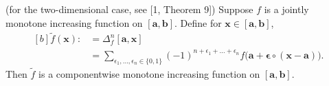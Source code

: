\documentclass{ijclclp}
\begin{document}
\begin{lemma}{(for the two-dimensional case, see [1, Theorem 9])}
    Suppose \(f\) is a jointly monotone increasing function on \([\boldsymbol{a},\boldsymbol{b}]\). Define for \(\boldsymbol{x}\in[\boldsymbol{a},\boldsymbol{b}]\), 
    \begin{equation}
        \begin{aligned}[b]
            \widetilde{f}(\boldsymbol{x})
            :&=\Delta_f^n[\boldsymbol{a},\boldsymbol{x}]\\
            &=\sum_{\epsilon_1,\dots,\epsilon_n\in\{0,1\}}(-1)^{n+\epsilon_1+\dots+\epsilon_n}
            f\big(\boldsymbol{a}+\boldsymbol{\epsilon}\circ(\boldsymbol{x}-\boldsymbol{a})\big). 
        \end{aligned}
    \end{equation}
    Then \(\widetilde{f}\) is a componentwise monotone increasing function on \([\boldsymbol{a},\boldsymbol{b}]\).\\[-0.5em]
\end{lemma}
\end{document}
